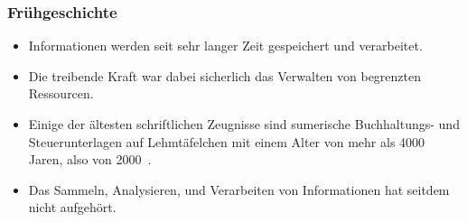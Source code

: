 \documentclass[aspectratio=169,mathserif,notheorems]{beamer}%
\begin{document}
\begin{frame}[t]%
\frametitle{Frühgeschichte}%
\begin{itemize}%
\item Informationen werden seit sehr langer Zeit gespeichert und verarbeitet.%
\item<2-> Die treibende Kraft war dabei sicherlich das Verwalten von begrenzten Ressourcen.%
\item<3-> Einige der ältesten schriftlichen Zeugnisse sind sumerische Buchhaltungs- und Steuerunterlagen auf Lehmtäfelchen mit einem Alter von mehr als 4000 Jaren, also von 2000~.%
\item<9-> Das Sammeln, Analysieren, und Verarbeiten von Informationen hat seitdem nicht aufgehört.%
\end{itemize}%
%
\end{frame}
\end{document}
